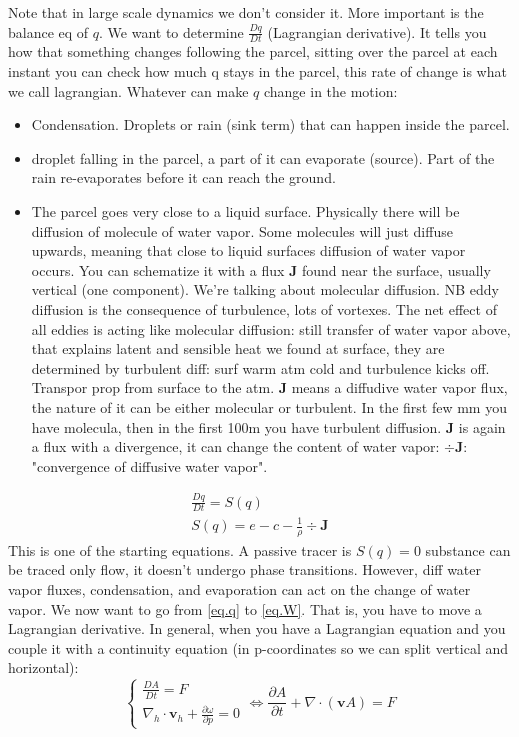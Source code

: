 Note that in large scale dynamics we don't consider it. More important is the balance eq of $q$.
We want to determine $\frac{Dq}{Dt}$ (Lagrangian derivative). It tells you how that something changes following the parcel, sitting over the parcel at each instant you can check how much q stays in the parcel, this rate of change is what we call lagrangian. Whatever can make $q$ change in the motion:
\begin{itemize}
    \item Condensation. Droplets or rain (sink term) that can happen inside the parcel.
    \item droplet falling in the parcel, a part of it can evaporate (source). Part of the rain re-evaporates before it can reach the ground. 
    \item The parcel goes very close to a liquid surface. Physically there will be diffusion of molecule of water vapor. Some molecules will just diffuse upwards, meaning that close to liquid surfaces diffusion of water vapor occurs. You can schematize it with a flux $\mathbf{J}$ found near the surface, usually vertical (one component). We're talking about molecular diffusion. NB eddy diffusion is the consequence of turbulence, lots of vortexes. The net effect of all eddies is acting like molecular diffusion: still transfer of water vapor above, that explains latent and sensible heat we found at surface, they are determined by turbulent diff: surf warm atm cold and turbulence kicks off. Transpor prop from surface to the atm. $\mathbf{J}$ means a diffudive water vapor flux, the nature of it can be either molecular or turbulent. In the first few mm you have molecula, then in the first 100m you have turbulent diffusion. $\mathbf{J}$ is again a flux with a divergence, it can change the content of water vapor: $\div{\mathbf{J}}$: "convergence of diffusive water vapor".
\end{itemize}
\begin{align}\label{eq.q}
    \frac{Dq}{Dt}=S(q)\\
    S(q)=e-c-\frac{1}{\rho}\div{\mathbf{J}}
\end{align}
This is one of the starting equations. A passive tracer is $S(q)=0$ substance can be traced only flow, it doesn't undergo phase transitions. However, diff water vapor fluxes, condensation, and evaporation can act on the change of water vapor. 
We now want to go from \eqref{eq.q} to \eqref{eq.W}. That is, you have to move a Lagrangian derivative. In general, when you have a Lagrangian equation and you couple it with a continuity equation (in p-coordinates so we can split vertical and horizontal):
\begin{equation}
    \begin{cases}
    \frac{DA}{Dt}=F\\
    \nabla_h\cdot \mathbf{v}_h+\frac{\partial\omega}{\partial p}=0 
\end{cases}\Leftrightarrow \frac{\partial A}{\partial t}+\nabla\cdot(\mathbf{v}A)=F
\end{equation}


